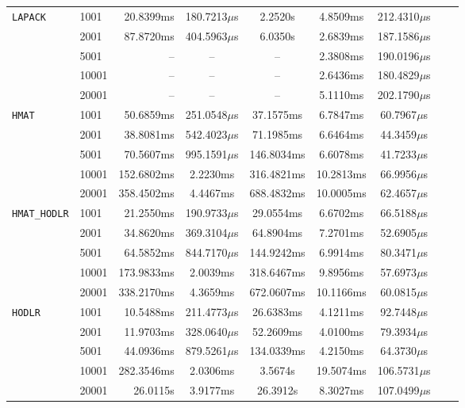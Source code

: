 \documentclass[11pt,a4paper]{article}
\begin{document}
\begin{center}
\begin{longtable}{llrcccccc}
\texttt{LAPACK} & 1001 & 20.8399ms & 180.7213$\mu$s & 2.2520s & 4.8509ms & 212.4310$\mu$s\\
 & 2001 & 87.8720ms & 404.5963$\mu$s & 6.0350s & 2.6839ms & 187.1586$\mu$s\\
 & 5001 & -- & -- & -- & 2.3808ms & 190.0196$\mu$s\\
 & 10001 & -- & -- & -- & 2.6436ms & 180.4829$\mu$s\\
 & 20001 & -- & -- & -- & 5.1110ms & 202.1790$\mu$s\\
\texttt{HMAT} & 1001 & 50.6859ms & 251.0548$\mu$s & 37.1575ms & 6.7847ms & 60.7967$\mu$s\\
 & 2001 & 38.8081ms & 542.4023$\mu$s & 71.1985ms & 6.6464ms & 44.3459$\mu$s\\
 & 5001 & 70.5607ms & 995.1591$\mu$s & 146.8034ms & 6.6078ms & 41.7233$\mu$s\\
 & 10001 & 152.6802ms & 2.2230ms & 316.4821ms & 10.2813ms & 66.9956$\mu$s\\
 & 20001 & 358.4502ms & 4.4467ms & 688.4832ms & 10.0005ms & 62.4657$\mu$s\\
\texttt{HMAT\_HODLR} & 1001 & 21.2550ms & 190.9733$\mu$s & 29.0554ms & 6.6702ms & 66.5188$\mu$s\\
 & 2001 & 34.8620ms & 369.3104$\mu$s & 64.8904ms & 7.2701ms & 52.6905$\mu$s\\
 & 5001 & 64.5852ms & 844.7170$\mu$s & 144.9242ms & 6.9914ms & 80.3471$\mu$s\\
 & 10001 & 173.9833ms & 2.0039ms & 318.6467ms & 9.8956ms & 57.6973$\mu$s\\
 & 20001 & 338.2170ms & 4.3659ms & 672.0607ms & 10.1166ms & 60.0815$\mu$s\\
\texttt{HODLR} & 1001 & 10.5488ms & 211.4773$\mu$s & 26.6383ms & 4.1211ms & 92.7448$\mu$s\\
 & 2001 & 11.9703ms & 328.0640$\mu$s & 52.2609ms & 4.0100ms & 79.3934$\mu$s\\
 & 5001 & 44.0936ms & 879.5261$\mu$s & 134.0339ms & 4.2150ms & 64.3730$\mu$s\\
 & 10001 & 282.3546ms & 2.0306ms & 3.5674s & 19.5074ms & 106.5731$\mu$s\\
 & 20001 & 26.0115s & 3.9177ms & 26.3912s & 8.3027ms & 107.0499$\mu$s\\
\bottomrule\end{longtable}\end{center}
\end{document}
